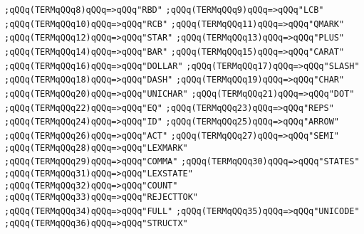 \verb|;qQQq(TERMqQQq8)qQQq=>qQQq"RBD"|\newline
\verb|;qQQq(TERMqQQq9)qQQq=>qQQq"LCB"|\newline
\verb|;qQQq(TERMqQQq10)qQQq=>qQQq"RCB"|\newline
\verb|;qQQq(TERMqQQq11)qQQq=>qQQq"QMARK"|\newline
\verb|;qQQq(TERMqQQq12)qQQq=>qQQq"STAR"|\newline
\verb|;qQQq(TERMqQQq13)qQQq=>qQQq"PLUS"|\newline
\verb|;qQQq(TERMqQQq14)qQQq=>qQQq"BAR"|\newline
\verb|;qQQq(TERMqQQq15)qQQq=>qQQq"CARAT"|\newline
\verb|;qQQq(TERMqQQq16)qQQq=>qQQq"DOLLAR"|\newline
\verb|;qQQq(TERMqQQq17)qQQq=>qQQq"SLASH"|\newline
\verb|;qQQq(TERMqQQq18)qQQq=>qQQq"DASH"|\newline
\verb|;qQQq(TERMqQQq19)qQQq=>qQQq"CHAR"|\newline
\verb|;qQQq(TERMqQQq20)qQQq=>qQQq"UNICHAR"|\newline
\verb|;qQQq(TERMqQQq21)qQQq=>qQQq"DOT"|\newline
\verb|;qQQq(TERMqQQq22)qQQq=>qQQq"EQ"|\newline
\verb|;qQQq(TERMqQQq23)qQQq=>qQQq"REPS"|\newline
\verb|;qQQq(TERMqQQq24)qQQq=>qQQq"ID"|\newline
\verb|;qQQq(TERMqQQq25)qQQq=>qQQq"ARROW"|\newline
\verb|;qQQq(TERMqQQq26)qQQq=>qQQq"ACT"|\newline
\verb|;qQQq(TERMqQQq27)qQQq=>qQQq"SEMI"|\newline
\verb|;qQQq(TERMqQQq28)qQQq=>qQQq"LEXMARK"|\newline
\verb|;qQQq(TERMqQQq29)qQQq=>qQQq"COMMA"|\newline
\verb|;qQQq(TERMqQQq30)qQQq=>qQQq"STATES"|\newline
\verb|;qQQq(TERMqQQq31)qQQq=>qQQq"LEXSTATE"|\newline
\verb|;qQQq(TERMqQQq32)qQQq=>qQQq"COUNT"|\newline
\verb|;qQQq(TERMqQQq33)qQQq=>qQQq"REJECTTOK"|\newline
\verb|;qQQq(TERMqQQq34)qQQq=>qQQq"FULL"|\newline
\verb|;qQQq(TERMqQQq35)qQQq=>qQQq"UNICODE"|\newline
\verb|;qQQq(TERMqQQq36)qQQq=>qQQq"STRUCTX"|\newline
